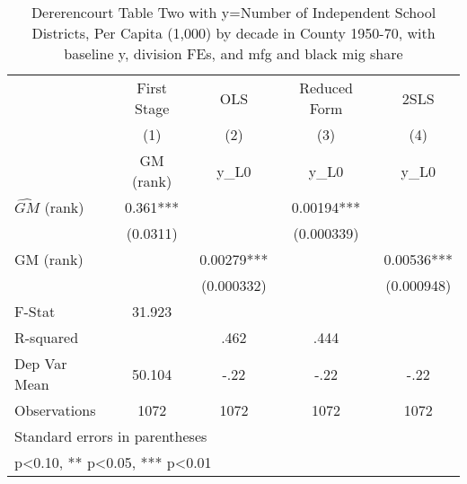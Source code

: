 \begin{table}[htbp]\centering
\def\sym#1{\ifmmode^{#1}\else\(^{#1}\)\fi}
\caption{Dererencourt Table Two with y=Number of Independent School Districts, Per Capita (1,000) by decade in County 1950-70, with baseline y, division FEs, and mfg and black mig share}
\begin{tabular}{l*{4}{c}}
\toprule
                    & First Stage   &         OLS   &Reduced Form   &        2SLS   \\
                    &\multicolumn{1}{c}{(1)}&\multicolumn{1}{c}{(2)}&\multicolumn{1}{c}{(3)}&\multicolumn{1}{c}{(4)}\\
                    &\multicolumn{1}{c}{GM  (rank)}&\multicolumn{1}{c}{y\_L0}&\multicolumn{1}{c}{y\_L0}&\multicolumn{1}{c}{y\_L0}\\
\midrule
$\hat{GM}$ (rank)   &       0.361***&               &     0.00194***&               \\
                    &    (0.0311)   &               &  (0.000339)   &               \\
\addlinespace
GM  (rank)          &               &     0.00279***&               &     0.00536***\\
                    &               &  (0.000332)   &               &  (0.000948)   \\
\midrule
F-Stat              &      31.923   &               &               &               \\
R-squared           &               &        .462   &        .444   &               \\
Dep Var Mean        &      50.104   &        -.22   &        -.22   &        -.22   \\
Observations        &        1072   &        1072   &        1072   &        1072   \\
\bottomrule
\multicolumn{5}{l}{\footnotesize Standard errors in parentheses}\\
\multicolumn{5}{l}{\footnotesize * p<0.10, ** p<0.05, *** p<0.01}\\
\end{tabular}
\end{table}
